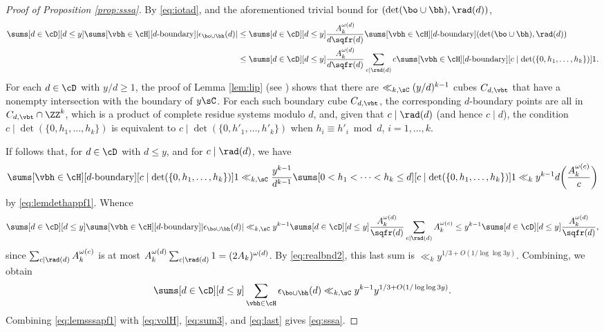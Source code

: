 \documentclass[12pt, reqno, twoside, letterpaper]{amsart}
\begin{document}
\begin{proof}[Proof of Proposition \ref{prop:sssa}]
By \eqref{eq:iotad}, and the aforementioned trivial bound for 
$(\det(\bo \cup \bh),\rad(d))$,  
\begin{align*} 
 \sums[d \in \cD][d \le y]
  \sums[\vbh \in \cH][\text{$d$-boundary}]
  |\epsilon_{\bo \cup \bh}(d)|
 & 
    \le 
     \sums[d \in \cD][d \le y] \frac{A_k^{\omega(d)}}{d\sqfr(d)}
      \sums[\vbh \in \cH][\text{$d$-boundary}] 
      (\det(\bo \cup \bh),\rad(d))
 \\
 & 
         \le 
          \sums[d \in \cD][d \le y] \frac{A_k^{\omega(d)}}{d\sqfr(d)}
           \sum_{c \mid \rad(d)} c
            \sums[\vbh \in \cH][\text{$d$-boundary}][c \mid \det(\{0,h_1,\ldots,h_k\})] 1.
\end{align*}
%
For each $d \in \cD$ with $y/d \ge 1$, the proof of 
Lemma \ref{lem:lip} (see \cite[pp.\ 128--129]{LAN:94}) shows that 
there are $\ll_{k,\sC} (y/d)^{k - 1}$ cubes $C_{d,\vbt}$ that have 
a nonempty intersection with the boundary of $y\sC$.
%
For each such boundary cube $C_{d,\vbt}$, the corresponding 
$d$-boundary points are all in $C_{d,\vbt} \cap \ZZ^k$, which is a 
product of complete residue systems modulo $d$, and, given that 
$c \mid \rad(d)$ (and hence $c \mid d$), the condition 
$c \mid \det(\{0,h_1,\ldots,h_k\})$ is equivalent to 
$c \mid \det(\{0,h'_1,\ldots,h'_k\})$ when 
$h_i \equiv h'_i \bmod d$, $i = 1,\ldots,k$.

If follows that, for $d \in \cD$ with $d \le y$, and for 
$c \mid \rad(d)$, we have 
\[
 \sums[\vbh \in \cH][\text{$d$-boundary}][c \mid \det(\{0,h_1,\ldots,h_k\})] 1
  \ll_{k,\sC}
   \frac{y^{k - 1}}{d^{k - 1}}
    \sums[0 < h_1 < \cdots < h_k \le d][c \mid \det(\{0,h_1,\ldots,h_k\})] 1
     \ll_k 
      y^{k - 1} d \bigg(\frac{A_k^{\omega(c)}}{c}\bigg)
\]
by \eqref{eq:lemdethappf1}. 
%
Whence 
\[
 \sums[d \in \cD][d \le y]
  \sums[\vbh \in \cH][\text{$d$-boundary}]
  |\epsilon_{\bo \cup \bh}(d)|
   \ll_{k,\sC}
    y^{k - 1} 
      \sums[d \in \cD][d \le y] \frac{A_k^{\omega(d)}}{\sqfr(d)}
       \sum_{c \mid \rad(d)} A_k^{\omega(c)}
        \le 
         y^{k - 1} 
          \sums[d \in \cD][d \le y] \frac{A_k^{\omega(d)}}{\sqfr(d)},
\]
since $\sum_{c \mid \rad(d)} A_k^{\omega(c)}$ is at most 
$
  A_k^{\omega(d)} \sum_{c \mid \rad(d)} 1
   = 
    (2A_k)^{\omega(d)}
$.
%
By \eqref{eq:realbnd2}, this last sum is 
$\ll_k y^{1/3 + O(1/\log\log 3y)}$.
%
Combining, we obtain 
\begin{equation}
 \label{eq:last}
  \sums[d \in \cD][d \le y] 
   \sum_{\vbh \in \cH}
    \epsilon_{\bo \cup \bh}(d)
     \ll_{k,\sC}
      y^{k - 1}y^{1/3 + O(1/\log\log 3y)}.
\end{equation}
%
Combining \eqref{eq:lemsssapf1} with \eqref{eq:volH}, 
\eqref{eq:sum3}, and \eqref{eq:last} gives \eqref{eq:sssa}.
\end{proof}
\end{document}

